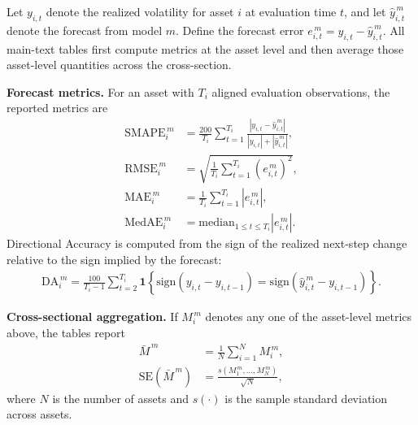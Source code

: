 ﻿\documentclass[a4paper]{article}
\begin{document}
\noindent
Let $y_{i,t}$ denote the realized volatility for asset $i$ at evaluation time $t$, and let $\hat{y}^{\,m}_{i,t}$ denote the forecast from model $m$. Define the forecast error $e^{\,m}_{i,t} = y_{i,t} - \hat{y}^{\,m}_{i,t}$. All main-text tables first compute metrics at the asset level and then average those asset-level quantities across the cross-section.

\vspace{0.15cm}
\noindent \textbf{Forecast metrics.}
For an asset with $T_i$ aligned evaluation observations, the reported metrics are
\begin{align*}
\mathrm{SMAPE}^{\,m}_i &= \frac{200}{T_i}\sum_{t=1}^{T_i}\frac{|y_{i,t}-\hat{y}^{\,m}_{i,t}|}{|y_{i,t}|+|\hat{y}^{\,m}_{i,t}|},\\
\mathrm{RMSE}^{\,m}_i &= \sqrt{\frac{1}{T_i}\sum_{t=1}^{T_i}\left(e^{\,m}_{i,t}\right)^2},\\
\mathrm{MAE}^{\,m}_i &= \frac{1}{T_i}\sum_{t=1}^{T_i}\left|e^{\,m}_{i,t}\right|,\\
\mathrm{MedAE}^{\,m}_i &= \mathrm{median}_{1 \leq t \leq T_i}\left|e^{\,m}_{i,t}\right|.
\end{align*}
Directional Accuracy is computed from the sign of the realized next-step change relative to the sign implied by the forecast:
\begin{align*}
\mathrm{DA}^{\,m}_i
= \frac{100}{T_i-1}\sum_{t=2}^{T_i}
\mathbf{1}\!\left\{
\mathrm{sign}(y_{i,t}-y_{i,t-1})
=
\mathrm{sign}(\hat{y}^{\,m}_{i,t}-y_{i,t-1})
\right\}.
\end{align*}

\vspace{0.15cm}
\noindent \textbf{Cross-sectional aggregation.}
If $M_i^{\,m}$ denotes any one of the asset-level metrics above, the tables report
\begin{align*}
\bar{M}^{\,m} &= \frac{1}{N}\sum_{i=1}^{N} M_i^{\,m},\\
\mathrm{SE}\!\left(\bar{M}^{\,m}\right) &= \frac{s(M_1^{\,m},\ldots,M_N^{\,m})}{\sqrt{N}},
\end{align*}
where $N$ is the number of assets and $s(\cdot)$ is the sample standard deviation across assets.
\end{document}
